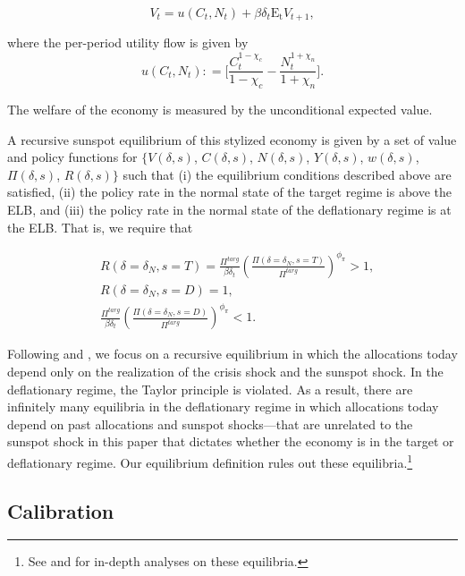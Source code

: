 \documentclass[11pt]{article}
\begin{document}
	\begin{equation}
		V_{t} = u(C_{t},N_{t}) + \beta \delta_{t}\mathrm{E_{t}}V_{t+1},
	\end{equation}
	
	\noindent where the per-period utility flow is given by
	\begin{equation}
		u(C_{t},N_{t}) : = \Bigg[\frac{C_{t}^{1-\chi_{c}}}{1-\chi_{c}}-\frac{N_{t}^{1+\chi_{n}}}{1+\chi_{n}}\Bigg]. 
	\end{equation}
	
	\noindent The welfare of the economy is measured by the unconditional expected value.
	
	A recursive sunspot equilibrium of this stylized economy is given by a set of value and policy functions for $\{V(\delta,s)$, $C(\delta,s)$, $N(\delta,s)$, $Y(\delta,s)$, $w(\delta,s)$, $\Pi(\delta,s)$, $R(\delta,s)\}$ such that (i) the equilibrium conditions described above are satisfied, (ii) the policy rate in the normal state of the target regime is above the ELB, and (iii) the policy rate in the normal state of the deflationary regime is at the ELB. That is, we require that 
	
	\begin{align}
		& R(\delta=\delta_{N},s=T) = \frac{\Pi^{targ}}{\beta\delta_t}\left(\frac{\Pi(\delta=\delta_{N},s=T)}{\Pi^{targ}}\right)^{\phi_{\pi}} > 1,\\
		& R(\delta=\delta_{N},s=D) = 1,\\
		& \frac{\Pi^{targ}}{\beta\delta_t}\left(\frac{\Pi(\delta=\delta_{N},s=D)}{\Pi^{targ}}\right)^{\phi_{\pi}} < 1.
	\end{align}
	
	Following \citet{MertensRavn2014} and \citet{AruobaCubaBordaSchorfheide2018}, we focus on a recursive equilibrium in which the allocations today depend only on the realization of the crisis shock and the sunspot shock. In the deflationary regime, the Taylor principle is violated. As a result, there are infinitely many equilibria in the deflationary regime in which allocations today depend on past allocations and sunspot shocks---that are unrelated to the sunspot shock in this paper that dictates whether the economy is in the target or deflationary regime. Our equilibrium definition rules out these equilibria.\footnote{See \citet{Hirose2007} and \citet{HiroseForthcoming} for in-depth analyses on these equilibria.}
	
	
	\subsection{Calibration}
	\label{S:Calibration}
	
\end{document}
